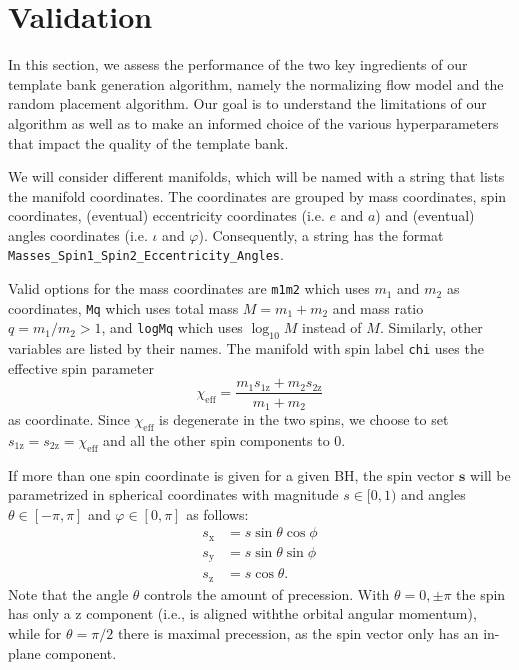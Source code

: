 \documentclass[twocolumn,showpacs,preprintnumbers,nofootinbib,prd,
superscriptaddress,10pt]{revtex4-2}
\begin{document}
\section{Validation} \label{sec:validation}

In this section, we assess the performance of the two key ingredients of our template bank generation algorithm, namely the normalizing flow model and the random placement algorithm.
Our goal is to understand the limitations of our algorithm as well as to make an informed choice of the various hyperparameters that impact the quality of the template bank.

We will consider different manifolds, which will be named with a string that lists the manifold coordinates. The coordinates are grouped by mass coordinates, spin coordinates, (eventual) eccentricity coordinates (i.e. $e$ and $a$) and (eventual) angles coordinates (i.e. $\iota$ and $\varphi$).
Consequently, a string has the format \texttt{Masses\_Spin1\_Spin2\_Eccentricity\_Angles}.

Valid options for the mass coordinates are \texttt{m1m2} which uses $m_1$ and $m_2$ as coordinates, \texttt{Mq} which uses total mass $M = m_1+m_2$ and mass ratio $q = m_1/m_2 >1$, and \texttt{logMq} which uses $\log_{10}M$ instead of $M$.
Similarly, other variables are listed by their names.
The manifold with spin label \texttt{chi} uses the effective spin parameter
%
\begin{equation}\label{eq:chieff}
	\chi_\text{eff} = \frac{m_1 s_\text{1z} + m_2 s_\text{2z}}{m_1 + m_2}
\end{equation}
%
as coordinate. Since $\chi_\text{eff}$ is degenerate in the two spins, we choose to set $s_\text{1z} = s_\text{2z} = \chi_\text{eff}$ and all the other spin components to $0$.

If more than one spin coordinate is given for a given BH, the spin vector $\mathbf{s}$ will be parametrized in spherical coordinates with magnitude ${s \in [0,1)}$ and angles ${\theta \in [-\pi,\pi]}$ and ${\varphi \in [0, \pi]}$ as follows:
%
\begin{align}
	s_\text{x} & = s \sin\theta \cos\phi \\
	s_\text{y} & = s \sin\theta \sin\phi \\
	s_\text{z} & = s \cos\theta.
\end{align}
%
Note that the angle $\theta$ controls the amount of precession. With $\theta = 0, \pm \pi$ the spin has only a z component (i.e., is aligned withthe orbital angular momentum), while for $\theta = \pi/2$ there is maximal precession, as the spin vector only has an in-plane component.
\end{document}
